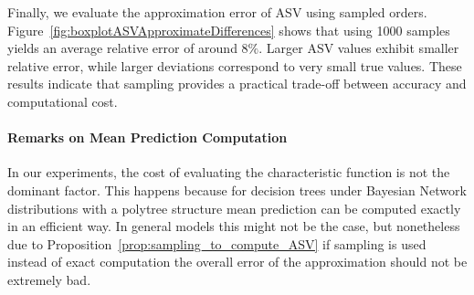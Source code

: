Finally, we evaluate the approximation error of ASV using sampled orders. Figure~\ref{fig:boxplotASVApproximateDifferences} shows that using 1000 samples yields an average relative error of around $8\%$. Larger ASV values exhibit smaller relative error, while larger deviations correspond to very small true values.
These results indicate that sampling provides a practical trade-off between accuracy and computational cost.

\vspace{-3mm}

\paragraph{Remarks on Mean Prediction Computation} In our experiments, the cost of evaluating the characteristic function is not the dominant factor. This happens because for decision trees under Bayesian Network distributions with a polytree structure mean prediction can be computed exactly in an efficient way. In general models this might not be the case, but nonetheless due to Proposition~\ref{prop:sampling_to_compute_ASV} if sampling is used instead of exact computation the overall error of the approximation should not be extremely bad.